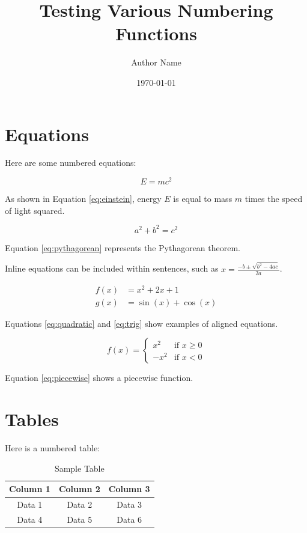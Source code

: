 \documentclass{article}
\begin{document}
\title{Testing Various Numbering Functions}
\author{Author Name}
\date{\today}
\maketitle

\section{Equations}
Here are some numbered equations:

\begin{equation}
E = mc^2
\label{eq:einstein}
\end{equation}

As shown in Equation \ref{eq:einstein}, energy \(E\) is equal to mass \(m\) times the speed of light squared.

\begin{equation}
a^2 + b^2 = c^2
\label{eq:pythagorean}
\end{equation}

Equation \ref{eq:pythagorean} represents the Pythagorean theorem.

Inline equations can be included within sentences, such as \(x = \frac{-b \pm \sqrt{b^2 - 4ac}}{2a}\).

\begin{align}
f(x) &= x^2 + 2x + 1 \label{eq:quadratic} \\
g(x) &= \sin(x) + \cos(x) \label{eq:trig}
\end{align}

Equations \ref{eq:quadratic} and \ref{eq:trig} show examples of aligned equations.

\begin{equation}
f(x) = 
\begin{cases} 
x^2 & \text{if } x \geq 0 \\
-x^2 & \text{if } x < 0 
\end{cases}
\label{eq:piecewise}
\end{equation}

Equation \ref{eq:piecewise} shows a piecewise function.

\section{Tables}
Here is a numbered table:
\begin{table}[h!]
\centering
\begin{tabular}{|c|c|c|}
\hline
Column 1 & Column 2 & Column 3 \\
\hline
Data 1 & Data 2 & Data 3 \\
\hline
Data 4 & Data 5 & Data 6 \\
\hline
\end{tabular}
\caption{Sample Table}
\label{table:sample}
\end{table}
\end{document}

